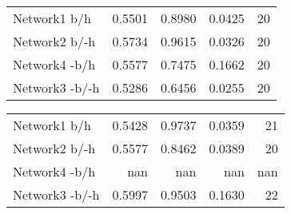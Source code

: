 \begin{table*}[h]
\begin{minipage}[h]{0.45\linewidth}
\begin{tabular}{lrrrr}
 Network1 b/h           &   0.5501 &      0.8980 &   0.0425 & 20 \\
 Network2 b/-h        &   0.5734 &      0.9615 &   0.0326 & 20 \\
 Network4 -b/h         &   0.5577 &      0.7475 &   0.1662 & 20 \\
 Network3 -b/-h       &   0.5286 &      0.6456 &   0.0255 & 20 \\
\hline
\end{tabular}
\end{minipage}
\hspace{0.5cm}
\begin{minipage}[h]{0.45\linewidth}
\begin{tabular}{lrrrr}
 Network1 b/h         &   0.5428 &      0.9737 &   0.0359 &  21 \\
 Network2 b/-h      &   0.5577 &      0.8462 &   0.0389 &  20 \\
 Network4 -b/h       & nan      &    nan      & nan      & nan      \\
 Network3 -b/-h     &   0.5997 &      0.9503 &   0.1630 &  22 \\
\hline
\end{tabular}
\end{minipage}
\end{table*}

